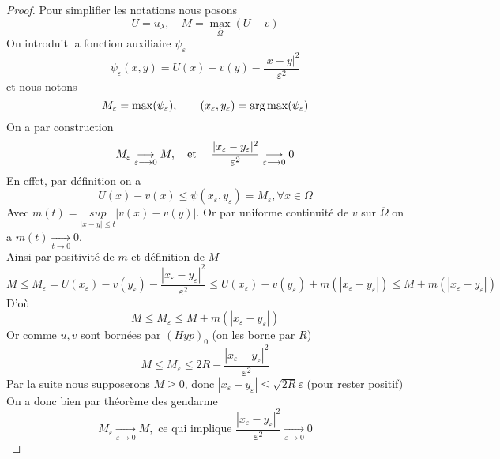 \begin{proof}
Pour simplifier les notations nous posons 
\begin{equation*}
        U=u_\lambda, \quad M=\max_{\overline{\Omega}}(U-v)
\end{equation*}
On introduit la fonction auxiliaire $\psi_\varepsilon$
\begin{equation*}
    \psi_\varepsilon(x,y)=U(x)-v(y)-\frac{|x-y|^2}{\varepsilon^2}
\end{equation*}
et nous notons
\begin{equation*}
    M_\varepsilon=\max(\psi_\varepsilon), \qquad (x_\varepsilon,y_\varepsilon)=\operatorname*{arg\,max}(\psi_\varepsilon)
\end{equation*}
On a par construction
\begin{equation*}
    M_\varepsilon\underset{\varepsilon\longrightarrow 0}{\longrightarrow} M, \text{\quad et \quad} \frac{|x_\varepsilon-y_\varepsilon|^2}{\varepsilon^2}\underset{\varepsilon\longrightarrow 0}{\longrightarrow} 0
\end{equation*}
En effet, par définition on a
\begin{equation*}
    U(x)-v(x)\le \psi(x_\varepsilon,y_\varepsilon)=M_\varepsilon, \forall x\in\overline{\Omega}
\end{equation*}
Avec $m(t)=\underset{|x-y|\le t}{sup}|v(x)-v(y)|$. Or par uniforme continuité de $v$ sur $\overline{\Omega}$ on a $m(t)\underset{ t\longrightarrow 0}{\longrightarrow} 0$.\\
Ainsi par positivité de $m$ et définition de $M$ 
\begin{equation*}
    M\le M_\varepsilon= U(x_\varepsilon)-v(y_\varepsilon)-\dfrac{|x_\varepsilon-y_\varepsilon|^2}{\varepsilon^2} \le U(x_\varepsilon)-v(y_\varepsilon)+ m(|x_\varepsilon -y_\varepsilon|)\le M+m(|x_\varepsilon -y_\varepsilon|)
\end{equation*}
D'où 
\begin{equation*}
    M\le M_\varepsilon\le M+ m(|x_\varepsilon -y_\varepsilon|)
\end{equation*}
Or comme $u,v$ sont bornées par $(Hyp)_0$ (on les borne par $R$)
\begin{equation*}
    M\le M_\varepsilon \le 2R - \dfrac{|x_\varepsilon-y_\varepsilon|^2}{\varepsilon^2}
\end{equation*}
Par la suite nous supposerons $M\ge 0$, donc $|x_\varepsilon-y_\varepsilon|\le \sqrt{2R}\varepsilon$ (pour rester positif)\\
On a donc bien par théorème des gendarme \begin{equation*}
    M_\varepsilon\underset{\varepsilon\longrightarrow 0}{\longrightarrow} M, \text{ ce qui implique } \frac{|x_\varepsilon-y_\varepsilon|^2}{\varepsilon^2}\underset{\varepsilon\longrightarrow 0}{\longrightarrow} 0
\end{equation*}


\end{proof}
